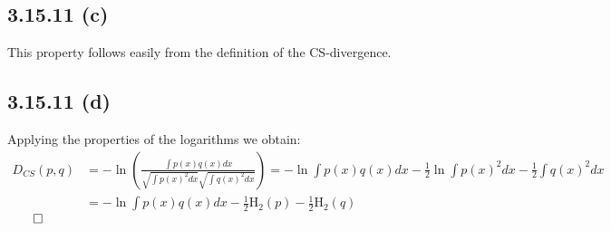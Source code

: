 \documentclass{exam}
\renewenvironment{proof}{{\noindent\itshape\ignorespaces}}{{\hfill$\qed$\\}}
\begin{document}
\subsection*{3.15.11 (c)}
This property follows easily from the definition of the CS-divergence. 

\subsection*{3.15.11 (d)}
Applying the properties of the logarithms we obtain:\\
\begin{proof}
    \begin{equation*}
        \begin{aligned}
            D_{CS}(p,q) &= -\ln(\displaystyle \frac{\displaystyle \int p(x) q(x) d x }{\displaystyle\sqrt{\int p(x)^2 d x } \displaystyle\sqrt{\int q(x)^2 d x }}) = -\ln \displaystyle \int p(x) q(x) d x - \frac{1}{2}\ln \displaystyle\int p(x)^2 d x - \frac{1}{2} \displaystyle\int q(x)^2 d x\\
                        &=  -\ln \displaystyle \int p(x) q(x) d x - \frac{1}{2}\text{H}_2(p) - \frac{1}{2}\text{H}_2(q)
        \end{aligned}    
    \end{equation*}    
\end{proof}
\end{document}
